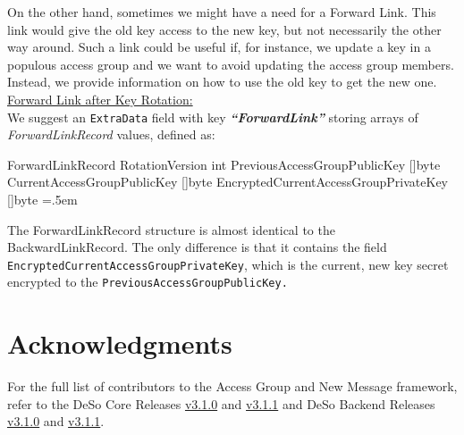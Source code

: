 \documentclass[oneside, 12pt]{article}
\newenvironment{lcverbatim}
 {\SaveVerbatim{cverb}}
 {\endSaveVerbatim
  \flushleft\fboxrule=0pt\fboxsep=.5em
  \colorbox{cverbbg}{%
    \makebox[\dimexpr\linewidth-2\fboxsep][l]{\BUseVerbatim{cverb}}%
  }
  \endflushleft
}
\begin{document}
\noindent On the other hand, sometimes we might have a need for a Forward Link. This link would give the old key access to the new key, but not necessarily the other way around. Such a link could be useful if, for instance, we update a key in a populous access group and we want to avoid updating the access group members. Instead, we provide information on how to use the old key to get the new one.\\

\noindent\underline{Forward Link after Key Rotation:}\\
\noindent We suggest an \texttt{ExtraData} field with key \textbf{\textit{“ForwardLink”}} storing arrays of \textit{ForwardLinkRecord} values, defined as:

\begin{lcverbatim}
ForwardLinkRecord
{
    RotationVersion                       int
    PreviousAccessGroupPublicKey          []byte
    CurrentAccessGroupPublicKey           []byte
    EncryptedCurrentAccessGroupPrivateKey []byte
}
\end{lcverbatim}

\noindent The ForwardLinkRecord structure is almost identical to the BackwardLinkRecord. The only difference is that it contains the field \texttt{EncryptedCurrentAccessGroupPrivateKey}, which is the current, new key secret encrypted to the \texttt{PreviousAccessGroupPublicKey.}

\section{Acknowledgments}
For the full list of contributors to the Access Group and New Message framework, refer to the DeSo Core Releases \href{https://github.com/deso-protocol/core/releases/tag/v3.1.0}{v3.1.0} and \href{https://github.com/deso-protocol/core/releases/tag/v3.1.1}{v3.1.1} and DeSo Backend Releases \href{https://github.com/deso-protocol/backend/releases/tag/v3.1.0}{v3.1.0} and \href{https://github.com/deso-protocol/backend/releases/tag/v3.1.1}{v3.1.1}.
\end{document}
